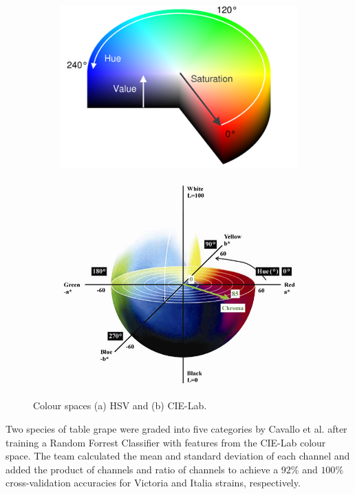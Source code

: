 \documentclass[fleqn,twoside,12pt]{report}
\begin{document}
\begin{figure}[h]
	\centering
	\begin{subfigure}{.5\textwidth}
		\centering
		\includegraphics[width=.7\linewidth]{hue_sat.png}
		\caption{}
		\label{fig:HSV}
	\end{subfigure}%
	\begin{subfigure}{.5\textwidth}
		\centering
		\includegraphics[width=.9\linewidth]{CIELab-colour-space.jpg}
		\caption{}
		\label{fig:Lab}
	\end{subfigure}%
	\caption{Colour spaces (a) HSV and (b) CIE-Lab.}
	\label{fig:colour-space}
\end{figure}

Two species of table grape were graded into five categories by Cavallo et al.\cite{cavallo} after training a Random Forrest Classifier with features from the CIE-Lab colour space. The team calculated the mean and standard deviation of each channel and added the product of channels and ratio of channels to achieve a $92\%$ and $100\%$ cross-validation accuracies for Victoria and Italia strains, respectively.
\end{document}
